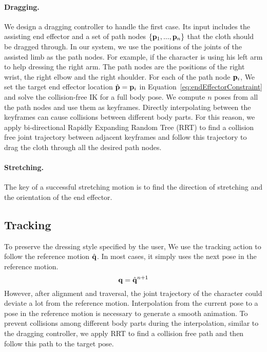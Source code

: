 \paragraph{Dragging.} We design a dragging controller to handle the first case. Its input includes the assisting end effector and a set of path nodes $\{\mathbf{p}_1 ,..., \mathbf{p}_n\}$ that the cloth should be dragged through. In our system, we use the positions of the joints of the assisted limb as the path nodes. For example, if the character is using his left arm to help dressing the right arm. The path nodes are the positions of the right wrist, the right elbow and the right shoulder. For each of the path node $\mathbf{p}_i$, We set the target end effector location $\hat{\mathbf{p}}=\mathbf{p}_i$ in Equation~\ref{eq:endEffectorConstraint} and solve the collision-free IK for a full body pose. We compute $n$ poses from all the path nodes and use them as keyframes. Directly interpolating between the keyframes can cause collisions between different body parts. For this reason, we apply bi-directional Rapidly Expanding Random Tree (RRT) \cite{} to find a collision free joint trajectory between adjacent keyframes and follow this trajectory to drag the cloth through all the desired path nodes.

\paragraph{Stretching.} The key of a successful stretching motion is to find the direction of stretching and the orientation of the end effector.


\subsection{Tracking}

To preserve the dressing style specified by the user, We use the tracking action to follow the reference motion $\hat{\mathbf{q}}$. In most cases, it simply uses the next pose in the reference motion.
\begin{displaymath}
\mathbf{q} = \hat{\mathbf{q}}^{n+1}
\end{displaymath}
However, after alignment and traversal, the joint trajectory of the character could deviate a lot from the reference motion. Interpolation from the current pose to a pose in the reference motion is necessary to generate a smooth animation. To prevent collisions among different body parts during the interpolation, similar to the dragging controller, we apply RRT \cite{} to find a collision free path and then follow this path to the target pose.


